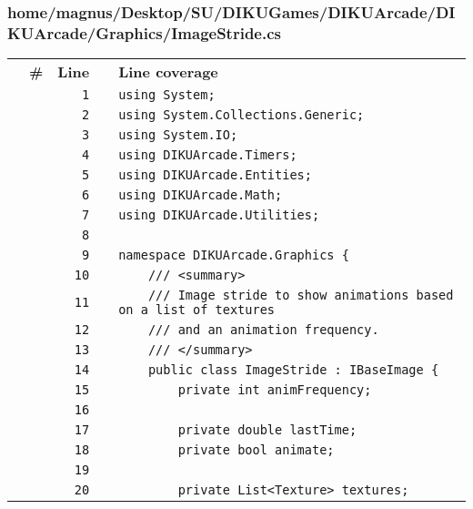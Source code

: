 \documentclass[a4paper,landscape,10pt]{article}
\begin{document}
\subsubsection{home/magnus/Desktop/SU/DIKUGames/DIKUArcade/DIKUArcade/Graphics/ImageStride.cs}
\begin{longtable}[l]{lrrll}
\textbf{} & \textbf{\#} & \textbf{Line} & \textbf{} & \textbf{Line coverage}\\
\cellcolor{gray} &  & \verb~1~ & & \verb~using System;~\\
\cellcolor{gray} &  & \verb~2~ & & \verb~using System.Collections.Generic;~\\
\cellcolor{gray} &  & \verb~3~ & & \verb~using System.IO;~\\
\cellcolor{gray} &  & \verb~4~ & & \verb~using DIKUArcade.Timers;~\\
\cellcolor{gray} &  & \verb~5~ & & \verb~using DIKUArcade.Entities;~\\
\cellcolor{gray} &  & \verb~6~ & & \verb~using DIKUArcade.Math;~\\
\cellcolor{gray} &  & \verb~7~ & & \verb~using DIKUArcade.Utilities;~\\
\cellcolor{gray} &  & \verb~8~ & & \verb~~\\
\cellcolor{gray} &  & \verb~9~ & & \verb~namespace DIKUArcade.Graphics {~\\
\cellcolor{gray} &  & \verb~10~ & & \verb~    /// <summary>~\\
\cellcolor{gray} &  & \verb~11~ & & \verb~    /// Image stride to show animations based on a list of textures~\\
\cellcolor{gray} &  & \verb~12~ & & \verb~    /// and an animation frequency.~\\
\cellcolor{gray} &  & \verb~13~ & & \verb~    /// </summary>~\\
\cellcolor{gray} &  & \verb~14~ & & \verb~    public class ImageStride : IBaseImage {~\\
\cellcolor{gray} &  & \verb~15~ & & \verb~        private int animFrequency;~\\
\cellcolor{gray} &  & \verb~16~ & & \verb~~\\
\cellcolor{gray} &  & \verb~17~ & & \verb~        private double lastTime;~\\
\cellcolor{gray} &  & \verb~18~ & & \verb~        private bool animate;~\\
\cellcolor{gray} &  & \verb~19~ & & \verb~~\\
\cellcolor{gray} &  & \verb~20~ & & \verb~        private List<Texture> textures;~\\

\end{longtable}
\end{document}
